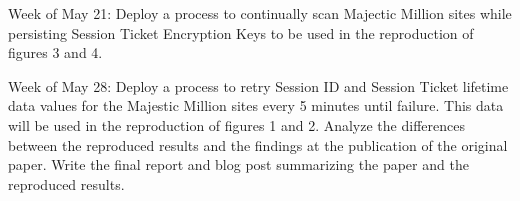 Week of May 21: Deploy a process to continually scan Majectic Million sites while persisting Session Ticket Encryption Keys to be used in the reproduction of figures 3 and 4.

Week of May 28: Deploy a process to retry Session ID and Session Ticket lifetime data values for the Majestic Million sites every 5 minutes until failure. This data will be used in the reproduction of figures 1 and 2. Analyze the differences between the reproduced results and the findings at the publication of the original paper. Write the final report and blog post summarizing the paper and the reproduced results.